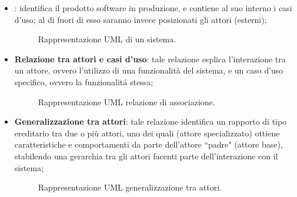 \begin{itemize}
\item {}: identifica il prodotto software in produzione, e contiene al suo interno i casi d'uso; al di fuori di esso saranno invece posizionati gli attori (esterni);
        \begin{figure}[H]
            \centering
            \caption{Rappresentazione UML di un sistema.}
            \label{fig:Rappresentazione UML di un sistema}
        \end{figure}
    \item \textbf{Relazione tra attori e casi d'uso}: tale relazione esplica l'interazione tra un attore, ovvero l'utilizzo di una funzionalità del sistema, e un caso d'uso specifico, ovvero la funzionalitá stessa;
        \begin{figure}[H]
            \centering
            \caption{Rappresentazione UML relazione di associazione.}
            \label{fig:Rappresentazione UML relazione di associazione}
        \end{figure}
    \item \textbf{Generalizzazione tra attori}: tale relazione identifica un rapporto di tipo ereditario tra due o più attori, uno dei quali (attore specializzato) ottiene caratteristiche e comportamenti da parte dell'attore ``padre" (attore base), stabilendo una gerarchia tra gli attori facenti parte dell'interazione con il sistema;
        \begin{figure}[H]
            \centering
            \caption{Rappresentazione UML generalizzazione tra attori.}
            \label{fig:Rappresentazione UML generalizzazione tra attori}

\end{figure}
\end{itemize}
